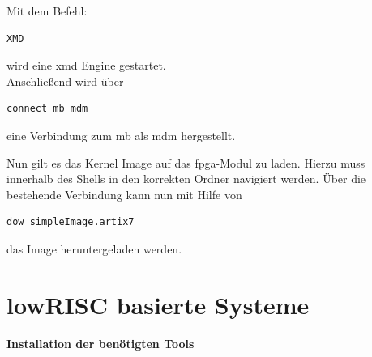 Mit dem Befehl:

\begin{lstlisting}[caption={Öffnen des \ac{xmd}},label={code:mbxmd}]
  XMD
   \end{lstlisting}


wird eine \ac{xmd} Engine gestartet.\\

Anschließend wird über\\
\begin{lstlisting}[caption={Herstellen der Verbindung zum \acl{mb}},label={code:mbtarget}]
connect mb mdm
   \end{lstlisting}

eine Verbindung zum \ac{mb} als \ac{mdm} hergestellt.

Nun gilt es das Kernel Image auf das \ac{fpga}-Modul zu laden.
Hierzu muss innerhalb des Shells in den korrekten Ordner navigiert werden.
Über die bestehende Verbindung kann nun mit Hilfe von
\begin{lstlisting}[caption={Download des Images},label={code:mbimage}]
  dow simpleImage.artix7
   \end{lstlisting}

das Image heruntergeladen werden.
\newpage
\section{lowRISC basierte Systeme}\label{kap:lowrisc}

\textbf{Installation der benötigten Tools}

